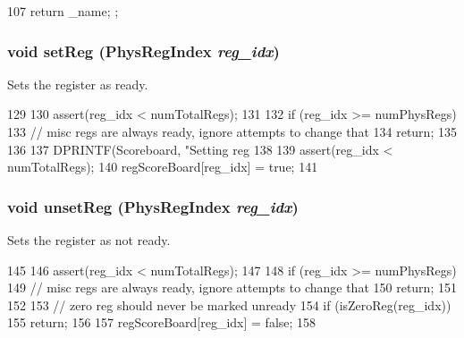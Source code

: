 \begin{DoxyCode}
107 { return _name; };
\end{DoxyCode}
\hypertarget{classScoreboard_abefd2f48474b0ac4510bef8672c8957a}{
\subsubsection[{setReg}]{\setlength{\rightskip}{0pt plus 5cm}void setReg ({\bf PhysRegIndex} {\em reg\_\-idx})}}
\label{classScoreboard_abefd2f48474b0ac4510bef8672c8957a}
Sets the register as ready. 


\begin{DoxyCode}
129     {
130         assert(reg_idx < numTotalRegs);
131 
132         if (reg_idx >= numPhysRegs) {
133             // misc regs are always ready, ignore attempts to change that
134             return;
135         }
136 
137         DPRINTF(Scoreboard, "Setting reg %
138 
139         assert(reg_idx < numTotalRegs);
140         regScoreBoard[reg_idx] = true;
141     }
\end{DoxyCode}
\hypertarget{classScoreboard_a69192a05bc6089fef590191f4ca52d11}{
\subsubsection[{unsetReg}]{\setlength{\rightskip}{0pt plus 5cm}void unsetReg ({\bf PhysRegIndex} {\em reg\_\-idx})}}
\label{classScoreboard_a69192a05bc6089fef590191f4ca52d11}
Sets the register as not ready. 


\begin{DoxyCode}
145     {
146         assert(reg_idx < numTotalRegs);
147 
148         if (reg_idx >= numPhysRegs) {
149             // misc regs are always ready, ignore attempts to change that
150             return;
151         }
152 
153         // zero reg should never be marked unready
154         if (isZeroReg(reg_idx))
155             return;
156 
157         regScoreBoard[reg_idx] = false;
158     }
\end{DoxyCode}


